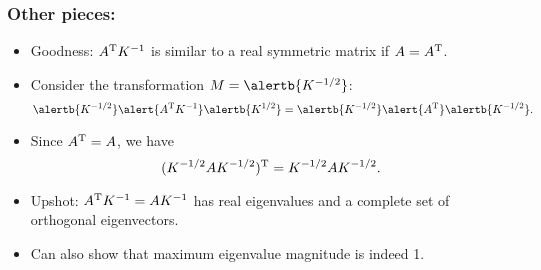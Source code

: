 \begin{frame}
  \frametitle{Other pieces:}

  \begin{itemize}
  \item<1->
    Goodness: $A^{\textnormal{T}} K^{-1}$ is similar to a real symmetric matrix
    if $A = A^{\textnormal{T}}$.
  \item<2->
    Consider the transformation $M = \alertb{K^{-1/2}}$:
    $$
    \alertb{K^{-1/2}}
    \alert{A^{\textnormal{T}} K^{-1}}
    \alertb{K^{1/2}}
    =
    \alertb{K^{-1/2}}
    \alert{A^{\textnormal{T}}}
    \alertb{K^{-1/2}}.
    $$
  \item<3->
    Since $A^{\textnormal{T}} = A$, we 
    have 
    $$
    ({K^{-1/2}}
    {A}
    {K^{-1/2}})^{\textnormal{T}}
    =
    {K^{-1/2}}
    {A}
    {K^{-1/2}}.
    $$
  \item<4->
    Upshot: $A^{\textnormal{T}} K^{-1} = A K^{-1}$ has real eigenvalues and a complete
    set of orthogonal eigenvectors.
  \item<5->
    Can also show that maximum eigenvalue magnitude is indeed 1.
  \end{itemize}

\end{frame}

